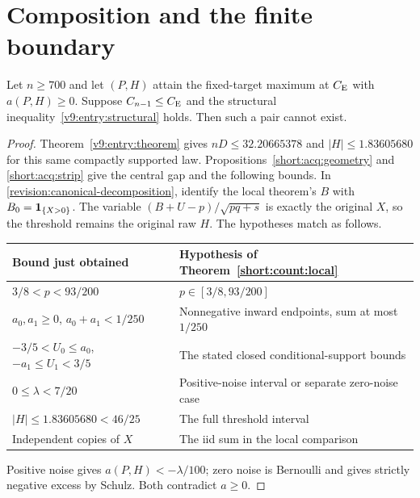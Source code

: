 \section{Composition and the finite boundary}\label{short:composition}
\begin{theorem}\label{short:acquired-exclusion}
Let $n\ge700$ and let $(P,H)$ attain the fixed-target maximum at $C_{\mathrm E}$
with $a(P,H)\ge0$. Suppose $C_{n-1}\le C_{\mathrm E}$ and the structural
inequality~\eqref{v9:entry:structural} holds. Then such a pair cannot exist.
\end{theorem}
\begin{proof}
Theorem~\ref{v9:entry:theorem} gives $nD\le32.20665378$ and
$|H|\le1.83605680$ for this same compactly supported law.
Propositions~\ref{short:acq:geometry} and \ref{short:acq:strip} give
the central gap and the following bounds. In
\eqref{revision:canonical-decomposition}, identify the local theorem's
$B$ with $B_0=\mathbf 1_{\{X>0\}}$. The variable
$(B+U-p)/\sqrt{pq+s}$ is exactly the original $X$, so the threshold
remains the original raw $H$. The hypotheses match as follows.
\begin{center}\small
\begin{tabular}{@{}P{.49\linewidth}P{.44\linewidth}@{}}
\toprule
Bound just obtained & Hypothesis of Theorem~\ref{short:count:local} \\
\midrule
$3/8<p<93/200$ & $p\in[3/8,93/200]$ \\
$a_0,a_1\ge0$, $a_0+a_1<1/250$ & Nonnegative inward endpoints, sum at most $1/250$ \\
$-3/5<U_0\le a_0$, $-a_1\le U_1<3/5$ & The stated closed conditional-support bounds \\
$0\le\lambda<7/20$ & Positive-noise interval or separate zero-noise case \\
$|H|\le1.83605680<46/25$ & The full threshold interval \\
Independent copies of $X$ & The iid sum in the local comparison \\
\bottomrule
\end{tabular}
\end{center}
Positive noise gives $a(P,H)<-\lambda/100$; zero noise is Bernoulli
and gives strictly negative excess by Schulz. Both contradict $a\ge0$.
\end{proof}

